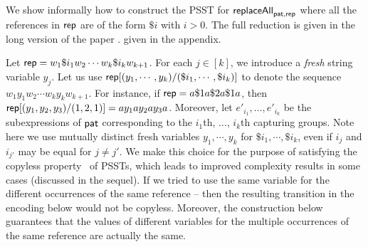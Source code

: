 We show informally how to construct the PSST for $\mathsf{replaceAll}_{\mathsf{pat}, \mathsf{rep}}$ where all the references in $\mathsf{rep}$ are of the form $\$i$ with $i > 0$.
The full reduction is 
\ifproceeding given in the long version of the paper \cite{popl22-full}.
\else given in the appendix. \fi

Let $\mathsf{rep} = w_1 \$i_1 w_2 \cdots w_k \$i_k w_{k+1}$. For each $j \in [k]$, we introduce a \emph{fresh} string variable $y_{j}$. 
Let us use $\mathsf{rep}[(y_1, \cdots, y_k)/(\$i_1,\cdots, \$i_k)]$ to denote the sequence $w_1 y_1 w_2 \cdots w_k y_k w_{k+1}$.
%
For instance, if $\mathsf{rep} = a \$1 a \$2 a \$1 a$, then 
$\mathsf{rep}[(y_1, y_2, y_3)/(1,2, 1)] = a y_1 a y_2 a y_3 a$. 
%
Moreover, let $e'_{i_1},\ldots, e'_{i_k}$ be the subexpressions of $\mathsf{pat}$ corresponding to the $i_1$th, $\ldots$, $i_k$th capturing groups.
Note here we use mutually distinct fresh variables $y_1, \cdots, y_k$ for $\$i_1, \cdots, \$i_k$, even if $i_j$ and $i_{j'}$ may be equal for $j \neq j'$. 
%
We make this choice for the purpose of satisfying the copyless property~\cite{AC10} of PSSTs, which leads to improved complexity results in some cases (discussed in the sequel).
If we tried to use the same variable for the different occurrences of the same reference – then the resulting transition in the encoding below would not be copyless.
Moreover, the construction below guarantees that the values of different variables for the multiple occurrences of the same reference are actually the same.





